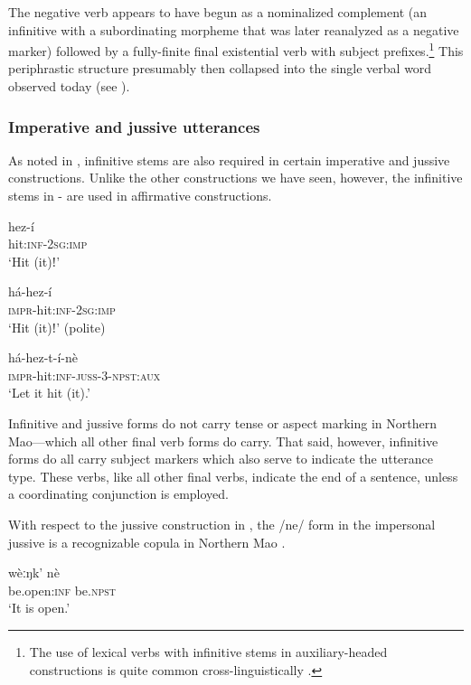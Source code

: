 \documentclass[output=paper]{langsci/langscibook}
\begin{document}
The negative verb appears to have begun as a nominalized complement (an infinitive with a subordinating morpheme that was later reanalyzed as a negative marker) followed by a fully-finite final existential verb with subject prefixes.\footnote{The use of lexical verbs with infinitive stems in auxiliary-headed constructions is quite common cross-linguistically \citep[56]{Anderson2006}.} This periphrastic structure presumably then collapsed into the single verbal word observed today (see ).

\subsubsection{Imperative and jussive utterances}\label{sec:mahland:3.1.2}


As noted in , infinitive stems are also required in certain imperative and jussive constructions. Unlike the other constructions we have seen, however, the infinitive stems in - are used in affirmative constructions. 

\ea\label{ex:mahland:61}
\gll hez-\'{i}\\
hit:\textsc{inf-2sg:imp}\\
\glt `Hit (it)ǃ'
\z

\ea\label{ex:mahland:62}
\gll h\'{a}-hez-\'{i}\\
\textsc{impr}{}-hit\textsc{:inf-2sg:imp}\\
\glt `Hit (it)ǃ' (polite)
\z

\ea\label{ex:mahland:63}
\gll h\'{a}-hez-t-\'{i}-n\`{e}\\
\textsc{impr}{}-hit:\textsc{inf-juss-3-npst:aux}\\
\glt `Let it hit (it).'
\z

Infinitive and jussive forms do not carry tense or aspect marking in Northern Mao—which all other final verb forms do carry. That said, however, infinitive forms do all carry subject markers which also serve to indicate the utterance type. These verbs, like all other final verbs, indicate the end of a sentence, unless a coordinating conjunction is employed.

With respect to the jussive construction in , the /ne/ form in the impersonal jussive  is a recognizable copula in Northern Mao  \citep[463]{Ahland2012}.

\ea\label{ex:mahland:64}
\gll w\`{e}ːŋk'           n\`{e}\\
be.open\textsc{:inf}    be.\textsc{npst}\\
\glt `It is open.' 
\z
\end{document}
